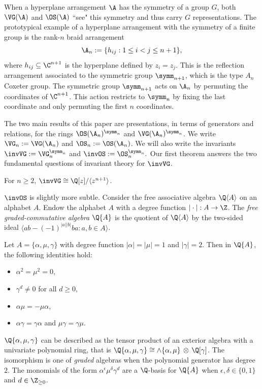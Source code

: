 \documentclass{amsart}
\begin{document}
When a hyperplane arrangement $\A$ has the symmetry of a  group $G$, both $\VG(\A)$ and $\OS(\A)$ ``see" this symmetry and thus carry $G$ representations.
The prototypical example of a hyperplane arrangement with the symmetry of a finite group is the rank-$n$ braid arrangement 
\[\A_{n} := \{h_{ij} : 1 \leq i < j \leq n+1\},\] where $h_{ij} \subseteq \C^{n+1}$ is the hyperplane defined by $z_i = z_j$.
This is the reflection arrangement associated to the symmetric group $\symm_{n+1}$, which is the type $A_n$ Coxeter group.
The symmetric group $\symm_{n+1}$ acts on $\A_n$ by permuting the coordinates of $\C^{n+1}$.
This action restricts to $\symm_n$ by fixing the last coordinate and only permuting the first $n$ coordinates.

The two main results of this paper are presentations, in terms of generators and relations, for the rings $\OS(\A_n)^{\symm_n}$ and $\VG(\A_n)^{\symm_n}$.
We write $\VG_n := \VG(\A_n)$ and $\OS_n := \OS(\A_n)$.
We will also write the invariants $\invVG := \VG_n^{\symm_n}$ and $\invOS := \OS_n^{\symm_n}.$
Our first theorem answers the two fundamental questions of invariant theory for $\invVG$.

\begin{theorem} \label{thm:VGnPresentation}
    For $n \geq 2$, $\invVG \cong \Q[z]/\langle z^{n+1}\rangle$.
\end{theorem}

$\invOS$ is slightly more subtle. 
Consider the free associative algebra $\Q\langle A \rangle$ on an alphabet $A$.
Endow the alphabet $A$ with a degree function $|\cdot |: A \to \Z$.
The \textit{free graded-commutative algebra} $\Q\{A\}$ is the quotient of $\Q\langle A \rangle$ by the two-sided ideal $\langle a b - (-1)^{|a||b|} ba : a,b \in A\rangle$.

\begin{example}
    Let $A = \{\alpha, \mu, \gamma\}$ with degree function $|\alpha| = |\mu| = 1$ and $|\gamma| = 2$.
    Then in $\Q \{A\}$, the following identities hold:
    \begin{itemize}
        \item $\alpha^2 = \mu^2 = 0$,
        \item $\gamma^d \neq 0$ for all $d \geq 0$,
        \item $\alpha \mu = -\mu\alpha$,
        \item $\alpha \gamma = \gamma \alpha$ and $\mu \gamma = \gamma \mu$.
    \end{itemize}
    $\Q\{\alpha, \mu, \gamma\}$ can be described as the tensor product of an exterior algebra with a univariate polynomial ring, that is $\Q\{\alpha, \mu, \gamma\}\cong \wedge\{\alpha, \mu\} \,\otimes\, \Q[\gamma]$.
    The isomorphism is one of \textit{graded} algebras when the polynomial generator has degree $2$.
    The monomials of the form $\alpha^\epsilon \mu^{\delta} \gamma^d$ are a $\Q$-basis for $\Q\{A\}$ when $\epsilon,\delta \in \{0,1\}$ and $d \in \Z_{\geq 0}$.
\end{example}
\end{document}
